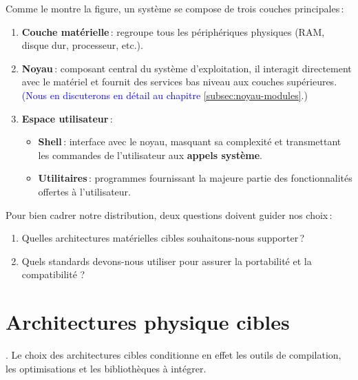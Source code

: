 Comme le montre la figure, un système se compose de trois couches principales :

\begin{enumerate}
  \item \textbf{Couche matérielle} : regroupe tous les périphériques physiques (RAM, disque dur, processeur, etc.).
  \item \textbf{Noyau} : composant central du système d’exploitation, il interagit directement avec le matériel et fournit des services bas niveau aux couches supérieures. \textcolor{blue}{(Nous en discuterons en détail au chapitre \ref{subsec:noyau-modules}}.)
  \item \textbf{Espace utilisateur} :  
    \begin{itemize}
      \item \textbf{Shell} : interface avec le noyau, masquant sa complexité et transmettant les commandes de l’utilisateur aux \textbf{appels système}.
      \item \textbf{Utilitaires} : programmes fournissant la majeure partie des fonctionnalités offertes à l’utilisateur.
    \end{itemize}
\end{enumerate}

Pour bien cadrer notre distribution, deux questions doivent guider nos choix :

\begin{enumerate}[label=\arabic*)]
  \item Quelles architectures matérielles cibles souhaitons-nous supporter ?
  \item Quels standards  devons-nous utiliser pour assurer la portabilité et la compatibilité ?
\end{enumerate}

\section{Architectures physique cibles}
\label{subsec:arch-cibles}

. Le choix des architectures cibles conditionne en effet les outils de compilation, les optimisations et les bibliothèques à intégrer.


